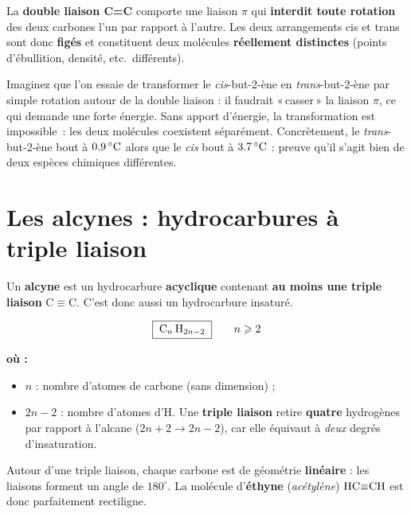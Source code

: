 \documentclass[11pt,a4paper]{article}
\providecommand{\degree}{^\circ} %
\newenvironment{ou}{%
  \par\smallskip\noindent\textbf{où :}\nopagebreak
  \begin{itemize}[leftmargin=1.8em,topsep=2pt,itemsep=1.5pt,parsep=0pt]}%
  {\end{itemize}}
\begin{document}
\begin{theoreme}
La \textbf{double liaison C=C} comporte une liaison $\pi$ qui \textbf{interdit toute rotation} des deux carbones l'un par rapport à l'autre. Les deux arrangements cis et trans sont donc \textbf{figés} et constituent deux molécules \textbf{réellement distinctes} (points d'ébullition, densité, etc.\ différents).
\end{theoreme}

\begin{exemple}
Imaginez que l'on essaie de transformer le \emph{cis}-but-2-ène en \emph{trans}-but-2-ène par simple rotation autour de la double liaison : il faudrait «\,casser\,» la liaison $\pi$, ce qui demande une forte énergie. Sans apport d'énergie, la transformation est impossible~: les deux molécules coexistent séparément. Concrètement, le \emph{trans}-but-2-ène bout à $\qty{0{,}9}{\celsius}$ alors que le \emph{cis} bout à $\qty{3{,}7}{\celsius}$ : preuve qu'il s'agit bien de deux espèces chimiques différentes.
\end{exemple}

\section{Les alcynes : hydrocarbures à triple liaison}
\begin{definition}[Alcyne]
Un \textbf{alcyne} est un hydrocarbure \textbf{acyclique} contenant \textbf{au moins une triple liaison} C$\equiv$C. C'est donc aussi un hydrocarbure insaturé.
\end{definition}

\begin{formule}
\[
\boxed{\;\ce{C_n H_{2n-2}}\;}
\qquad n\geqslant 2
\]
\begin{ou}
  \item $n$ : nombre d'atomes de carbone (sans dimension) ;
  \item $2n-2$ : nombre d'atomes d'H. Une \textbf{triple liaison} retire \textbf{quatre} hydrogènes par rapport à l'alcane ($2n+2\to 2n-2$), car elle équivaut à \emph{deux} degrés d'insaturation.
\end{ou}
\end{formule}

\begin{remarque}
Autour d'une triple liaison, chaque carbone est de géométrie \textbf{linéaire} : les liaisons forment un angle de $180\degree$. La molécule d'\textbf{éthyne} (\emph{acétylène}) $\ce{HC#CH}$ est donc parfaitement rectiligne.
\end{remarque}
\end{document}
